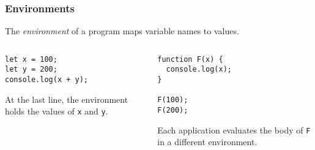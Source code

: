 \documentclass[8pt,pdf,handout]{beamer}
\begin{document}
\begin{frame}[fragile]
\frametitle{Environments}

\begin{definition}
The \emph{environment} of a program maps variable names to values.
\end{definition}


\begin{columns}

\begin{column}{0.4\textwidth}
\begin{lstlisting}
let x = 100;
let y = 200;
console.log(x + y);
\end{lstlisting}
At the last line, the environment holds the values of
\lstinline|x| and \lstinline|y|.
\end{column}

\begin{column}{0.4\textwidth}
\begin{lstlisting}
function F(x) {
  console.log(x);
}

F(100);
F(200);
\end{lstlisting}
Each application evaluates the body of \lstinline|F| 
in a different environment.
\end{column}

\end{columns}

\end{frame}
\end{document}
